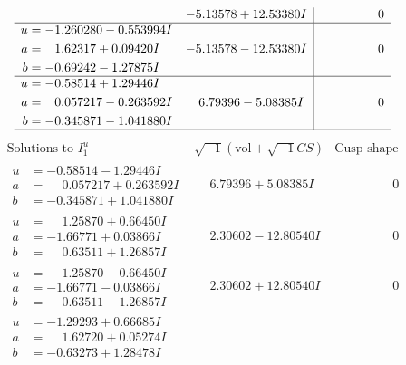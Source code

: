 \documentclass[1p]{elsarticle_modified}
\theoremstyle{definition}
\newcommand{\I}{\sqrt{-1}}
\begin{document}
$$\begin{array}{c|c|c}
 & -5.13578 + 12.53380 I & \phantom{-0.000000 } 0 \\ \hline\begin{aligned}
u &= -1.260280 - 0.553994 I \\
a &= \phantom{-}1.62317 + 0.09420 I \\
b &= -0.69242 - 1.27875 I\end{aligned}
 & -5.13578 - 12.53380 I & \phantom{-0.000000 } 0 \\ \hline\begin{aligned}
u &= -0.58514 + 1.29446 I \\
a &= \phantom{-}0.057217 - 0.263592 I \\
b &= -0.345871 - 1.041880 I\end{aligned}
 & \phantom{-}6.79396 - 5.08385 I & \phantom{-0.000000 } 0\\
 \hline 
 \end{array}$$\newpage$$\begin{array}{c|c|c}  
\text{Solutions to }I^u_{1}& \I (\text{vol} + \sqrt{-1}CS) & \text{Cusp shape}\\
 \hline 
\begin{aligned}
u &= -0.58514 - 1.29446 I \\
a &= \phantom{-}0.057217 + 0.263592 I \\
b &= -0.345871 + 1.041880 I\end{aligned}
 & \phantom{-}6.79396 + 5.08385 I & \phantom{-0.000000 } 0 \\ \hline\begin{aligned}
u &= \phantom{-}1.25870 + 0.66450 I \\
a &= -1.66771 + 0.03866 I \\
b &= \phantom{-}0.63511 + 1.26857 I\end{aligned}
 & \phantom{-}2.30602 - 12.80540 I & \phantom{-0.000000 } 0 \\ \hline\begin{aligned}
u &= \phantom{-}1.25870 - 0.66450 I \\
a &= -1.66771 - 0.03866 I \\
b &= \phantom{-}0.63511 - 1.26857 I\end{aligned}
 & \phantom{-}2.30602 + 12.80540 I & \phantom{-0.000000 } 0 \\ \hline\begin{aligned}
u &= -1.29293 + 0.66685 I \\
a &= \phantom{-}1.62720 + 0.05274 I \\
b &= -0.63273 + 1.28478 I\end{aligned}

\end{array}$$
\end{document}
